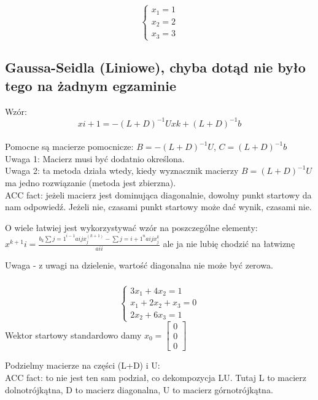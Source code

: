 \documentclass{article}
\begin{document}
\begin{equation*}\begin{cases}
    x_1=1\\
    x_2=2\\
    x_3=3
\end{cases}\end{equation*}

\subsection{Gaussa-Seidla (Liniowe), chyba dotąd nie było tego na żadnym egzaminie}
Wzór: $$x{i+1}= - (L+D)^{-1}Ux{k} + (L+D)^{-1}b$$\\

Pomocne są macierze pomocnicze: $B = -(L+D)^{-1}U$, $C = (L+D)^{-1}b$ \\
Uwaga 1: Macierz musi być dodatnio określona. \\
Uwaga 2: ta metoda działa wtedy, kiedy wyznacznik macierzy $B = (L+D)^{-1}U$
ma jedno rozwiązanie (metoda jest zbierzna). \\ 
ACC fact: jeżeli macierz jest dominująca diagonalnie, dowolny punkt startowy 
da nam odpowiedź. Jeżeli nie, czasami punkt startowy może dać wynik, czasami nie.

O wiele łatwiej jest wykorzystywać wzór na poszczególne elementy:
$x^{k+1}{i} = \frac{b_k \sum{j=1}^{i-1}a{ij}x_j^(k+1) - \sum{j=i+1}^na{ij}x_j^k}{a{ii}} $
ale ja nie lubię chodzić na łatwiznę

Uwaga - z uwagi na dzielenie, wartość diagonalna nie może być zerowa.

\subsubsection{}
\begin{equation}\begin{cases}
    3x_1+4x_2=1\\
    x_1+2x_2+x_3=0\\
    2x_2+6x_3=1
\end{cases}\end{equation}
Wektor startowy standardowo damy
$x_0 = \begin{bmatrix} 0 \\ 0 \\ 0 \end{bmatrix} $

Podzielmy macierze na części (L+D) i U:\\
ACC fact: to nie jest ten sam podział, co dekompozycja LU. Tutaj L to macierz dolnotrójkątna, D to macierz diagonalna, U to macierz górnotrójkątna.
\end{document}
